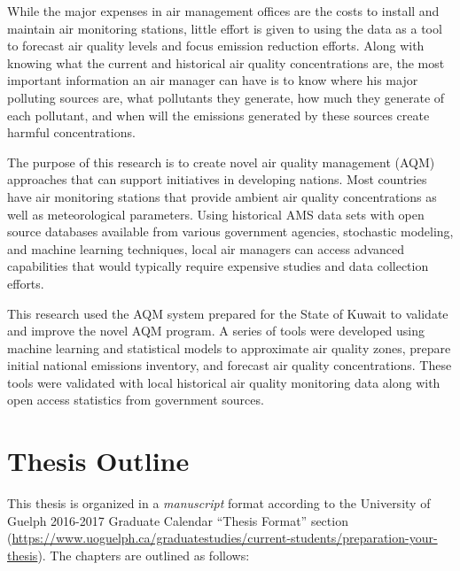 While the major expenses in air management offices are the costs to install and maintain air monitoring stations,  little effort is given to using the data as a tool to forecast air quality levels and focus emission reduction efforts. Along with knowing what the current and historical air quality concentrations are, the most important information an air manager can have is to know where his major polluting sources are, what pollutants they generate, how much they generate of each pollutant, and when will the emissions generated by these sources create harmful concentrations.

The purpose of this research is to create novel air quality management (AQM) approaches that can support initiatives in developing nations. Most countries have air monitoring stations that provide ambient air quality concentrations as well as meteorological parameters. Using historical AMS data sets with open source databases available from various government agencies, stochastic modeling, and machine learning techniques, local air managers can access advanced capabilities that would typically require expensive studies and data collection efforts.

This research used the AQM system prepared for the State of Kuwait to validate and improve the novel AQM program. A series of tools were developed using machine learning and statistical models to approximate air quality zones, prepare initial national emissions inventory, and forecast air quality concentrations.  These tools were validated with local historical air quality monitoring data along with open access statistics from government sources.

\section{Thesis Outline}
This thesis is organized in a \textit{manuscript} format according to the University of Guelph 2016-2017 Graduate Calendar ``Thesis Format'' section (\url{https://www.uoguelph.ca/graduatestudies/current-students/preparation-your-thesis}).  The chapters are outlined as follows:

